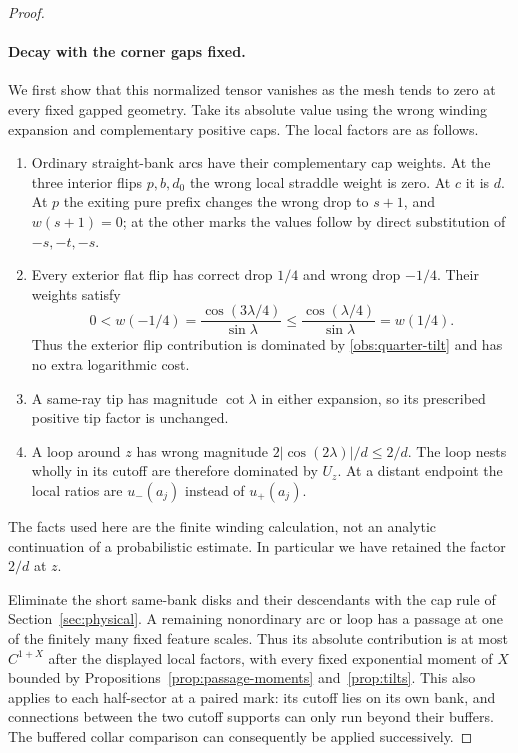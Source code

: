 \begin{proof}
\paragraph{Decay with the corner gaps fixed.}
We first show that this normalized tensor vanishes as the mesh tends
to zero at every fixed gapped geometry.  Take its absolute value using
the wrong winding expansion and complementary positive caps.
The local factors are as follows.
\begin{enumerate}[label=(\roman*),leftmargin=*]
\item Ordinary straight-bank arcs have their complementary cap weights.
At the three interior flips $p,b,d_0$ the wrong local straddle weight
is zero.  At $c$ it is $d$.  At $p$ the exiting pure prefix changes
the wrong drop to $s+1$, and $w(s+1)=0$; at the other marks the
values follow by direct substitution of $-s,-t,-s$.
\item Every exterior flat flip has correct drop $1/4$ and wrong drop
$-1/4$.  Their weights satisfy
\[
 0<w(-1/4)=\frac{\cos(3\lambda/4)}{\sin\lambda}
 \le \frac{\cos(\lambda/4)}{\sin\lambda}=w(1/4).
\]
Thus the exterior flip contribution is dominated by
\eqref{obs:quarter-tilt} and has no extra logarithmic cost.
\item A same-ray tip has magnitude $\cot\lambda$ in either expansion,
so its prescribed positive tip factor is unchanged.
\item A loop around $z$ has wrong magnitude
$2|\cos(2\lambda)|/d\le2/d$.  The loop nests wholly in its cutoff
are therefore dominated by $U_z$.  At a distant endpoint the local
ratios are $u_-(a_j)$ instead of $u_+(a_j)$.
\end{enumerate}
The facts used here are the finite winding calculation, not an
analytic continuation of a probabilistic estimate.  In particular
we have retained the factor $2/d$ at $z$.

Eliminate the short same-bank disks and their descendants with
the cap rule of Section~\ref{sec:physical}.  A remaining nonordinary
arc or loop has a passage at one of the finitely many fixed feature
scales.  Thus its absolute contribution is at most $C^{1+X}$ after
the displayed local factors, with every fixed exponential moment
of $X$ bounded by Propositions~\ref{prop:passage-moments}
and~\ref{prop:tilts}.  This also applies to each half-sector at a
paired mark: its cutoff lies on its own bank, and connections between
the two cutoff supports can only run beyond their buffers.  The
buffered collar comparison can consequently be applied successively.


\end{proof}
